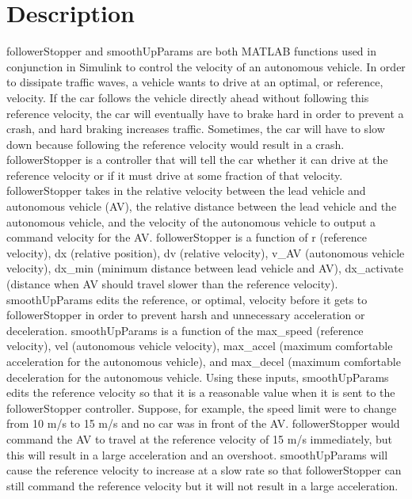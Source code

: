 \documentclass[12pt, letterpaper]{article}
\newcommand{\tab}{\hspace*{2em}}
\begin{document}
\section{Description}
followerStopper and smoothUpParams are both MATLAB functions used in conjunction in Simulink to control the velocity of an autonomous vehicle. In order to dissipate traffic waves, a vehicle wants to drive at an optimal, or reference, velocity. If the car follows the vehicle directly ahead without following this reference velocity, the car will eventually have to brake hard in order to prevent a crash, and hard braking increases traffic. Sometimes, the car will have to slow down because following the reference velocity would result in a crash. followerStopper is a controller that will tell the car whether it can drive at the reference velocity or if it must drive at some fraction of that velocity. \\
\tab followerStopper takes in the relative velocity between the lead vehicle and autonomous vehicle (AV), the relative distance between the lead vehicle and the autonomous vehicle, and the velocity of the autonomous vehicle to output a command velocity for the AV. followerStopper is a function of r (reference velocity), dx (relative position), dv (relative velocity), v\_AV (autonomous vehicle velocity), dx\_min (minimum distance between lead vehicle and AV), dx\_activate (distance when AV should travel slower than the reference velocity). \\
\tab smoothUpParams edits the reference, or optimal, velocity before it gets to followerStopper in order to prevent harsh and unnecessary acceleration or deceleration. smoothUpParams is a function of the max\_speed (reference velocity), vel (autonomous vehicle velocity), max\_accel (maximum comfortable acceleration for the autonomous vehicle), and max\_decel (maximum comfortable deceleration for the autonomous vehicle. Using these inputs, smoothUpParams edits the reference velocity so that it is a reasonable value when it is sent to the followerStopper controller. Suppose, for example, the speed limit were to change from 10 m/s to 15 m/s and no car was in front of the AV. followerStopper would command the AV to travel at the reference velocity of 15 m/s immediately, but this will result in a large acceleration and an overshoot. smoothUpParams will cause the reference velocity to increase at a slow rate so that followerStopper can still command the reference velocity but it will not result in a large acceleration.

\end{document}
